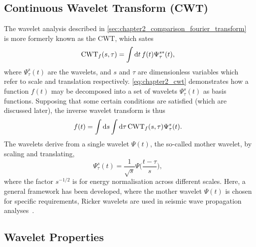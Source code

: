 

\subsection{Continuous Wavelet Transform (CWT)}\label{sec:chapter2_continuous_wavelet_transform}

The wavelet analysis described in \cref{sec:chapter2_comparison_fourier_transform} is more formerly known as the CWT, which sates
%
\begin{equation}\label{eq:chapter2_cwt}
	\text{CWT}_{f}(s,\tau)
	= \int\dd{t} f(t) \Psi^{s\ast}_{\tau}(t),
\end{equation}
%
where \(\Psi^{s}_{\tau}(t)\) are the wavelets, and \(s\) and \(\tau{}\) are dimensionless variables which refer to scale and translation respectively.
\cref{eq:chapter2_cwt} demonstrates how a function \(f(t)\) may be decomposed into a set of wavelets \(\Psi^{s}_{\tau}(t)\) as basis functions.
Supposing that some certain conditions are satisfied (which are discussed later), the inverse wavelet transform is thus
%
\begin{equation}
	f(t)
	= \int\dd{s} \int\dd{\tau} \text{CWT}_{f}(s,\tau) \Psi^{s}_{\tau}(t).
\end{equation}
%
The wavelets derive from a single wavelet \(\Psi(t)\), the so-called mother wavelet, by scaling and translating, \ie{}
%
\begin{equation}\label{eq:chapter2_mother_wavelet}
	\Psi^{s}_{\tau}(t)
	= \frac{1}{\sqrt{s}} \Psi\bigg(\frac{t-\tau}{s}\bigg),
\end{equation}
%
where the factor \(s^{-1/2}\) is for energy normalisation across different scales.
Here, a general framework has been developed, where the mother wavelet \(\Psi(t)\) is chosen for specific requirements, \eg{} Ricker wavelets are used in seismic wave propagation analyses~\cite{Wang2014}.

\subsection{Wavelet Properties}

